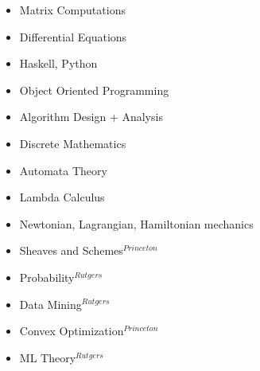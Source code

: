 \begin{multicols}{3}
\begin{itemize}
\setlength\itemsep{-0.5em}
\item Matrix Computations
\item Differential Equations
\item Haskell, Python
\item Object Oriented Programming
\item Algorithm Design + Analysis
\item Discrete Mathematics
\item Automata Theory
\item Lambda Calculus
\item Newtonian, Lagrangian, Hamiltonian mechanics
\item Sheaves and Schemes$^{Princeton}$
\item Probability$^{Rutgers}$
\item Data Mining$^{Rutgers}$
\item Convex Optimization$^{Princeton}$
\item ML Theory$^{Rutgers}$
\end{itemize}
\end{multicols}


\vspace{-5pt}



